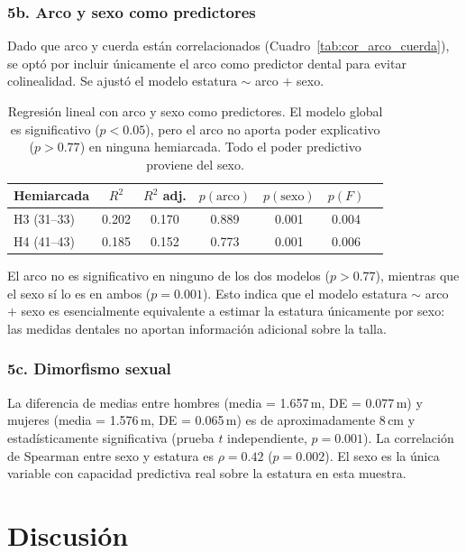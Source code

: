 \documentclass[11pt,letterpaper]{article}
\begin{document}
\subsubsection*{5b. Arco y sexo como predictores}

Dado que arco y cuerda están correlacionados (Cuadro~\ref{tab:cor_arco_cuerda}), se optó por incluir únicamente el arco como predictor dental para evitar colinealidad. Se ajustó el modelo estatura $\sim$ arco $+$ sexo.

\begin{table}[h!]
\centering
\begin{tabular}{lcccccc}
\toprule
\textbf{Hemiarcada} & $R^2$ & $R^2$ adj. & $p(\text{arco})$ & $p(\text{sexo})$ & $p(F)$ \\
\midrule
H3 (31--33) & 0.202 & 0.170 & 0.889 & 0.001 & 0.004 \\
H4 (41--43) & 0.185 & 0.152 & 0.773 & 0.001 & 0.006 \\
\bottomrule
\end{tabular}
\caption{Regresión lineal con arco y sexo como predictores. El modelo global es significativo ($p < 0.05$), pero el arco no aporta poder explicativo ($p > 0.77$) en ninguna hemiarcada. Todo el poder predictivo proviene del sexo.}
\label{tab:reg_arco_sexo}
\end{table}

El arco no es significativo en ninguno de los dos modelos ($p > 0.77$), mientras que el sexo sí lo es en ambos ($p = 0.001$). Esto indica que el modelo estatura $\sim$ arco $+$ sexo es esencialmente equivalente a estimar la estatura únicamente por sexo: las medidas dentales no aportan información adicional sobre la talla.

\subsubsection*{5c. Dimorfismo sexual}

La diferencia de medias entre hombres (media = 1.657\,m, DE = 0.077\,m) y mujeres (media = 1.576\,m, DE = 0.065\,m) es de aproximadamente 8\,cm y estadísticamente significativa (prueba $t$ independiente, $p = 0.001$). La correlación de Spearman entre sexo y estatura es $\rho = 0.42$ ($p = 0.002$). El sexo es la única variable con capacidad predictiva real sobre la estatura en esta muestra.


\section*{Discusión}
\end{document}
